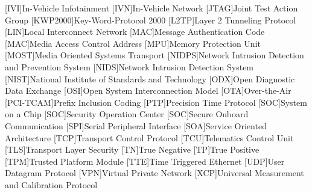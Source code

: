 \begin{acronym}
[IVI]{In-Vehicle Infotainment}
[IVN]{In-Vehicle Network}
[JTAG]{Joint Test Action Group}
[KWP2000]{Key-Word-Protocol 2000}
[L2TP]{Layer 2 Tunneling Protocol}
[LIN]{Local Interconnect Network}
[MAC]{Message Authentication Code} 	%
[MAC]{Media Access Control Address}	%
[MPU]{Memory Protection Unit}
[MOST]{Media Oriented Systems Transport}
[NIDPS]{Network Intrusion Detection and Prevention System}
[NIDS]{Network Intrusion Detection System}
[NIST]{National Institute of Standards and Technology}
[ODX]{Open Diagnostic Data Exchange}
[OSI]{Open System Interconnection Model}
[OTA]{Over-the-Air}
[PCI-TCAM]{Prefix Inclusion Coding} 				%
[PTP]{Precision Time Protocol}
[SOC]{System on a Chip}
[SOC]{Security Operation Center}
[SOC]{Secure Onboard Communication}          %
[SPI]{Serial Peripheral Interface}
[SOA]{Service Oriented Architecture}
[TCP]{Transport Control Protocol}
[TCU]{Telematics Control Unit}
[TLS]{Transport Layer Security}
[TN]{True Negative}
[TP]{True Positive}
[TPM]{Trusted Platform Module}
[TTE]{Time Triggered Ethernet}		%
[UDP]{User Datagram Protocol}
[VPN]{Virtual Private Network}
[XCP]{Universal Measurement and Calibration Protocol}
\end{acronym}
